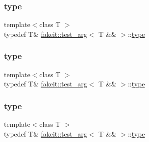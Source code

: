 \subsubsection{\texorpdfstring{type}{type}\hspace{0.1cm}{\footnotesize\ttfamily [1/9]}}
{\footnotesize\ttfamily template$<$class T $>$ \\
typedef T\& \mbox{\hyperlink{structfakeit_1_1test__arg}{fakeit\+::test\+\_\+arg}}$<$ T \&\& $>$\+::\mbox{\hyperlink{structfakeit_1_1test__arg_3_01T_01_6_6_01_4_aaace2782c3dd97bd31e137f8c7c47f5f}{type}}}

\mbox{\label{structfakeit_1_1test__arg_3_01T_01_6_6_01_4_aaace2782c3dd97bd31e137f8c7c47f5f}} 
\subsubsection{\texorpdfstring{type}{type}\hspace{0.1cm}{\footnotesize\ttfamily [2/9]}}
{\footnotesize\ttfamily template$<$class T $>$ \\
typedef T\& \mbox{\hyperlink{structfakeit_1_1test__arg}{fakeit\+::test\+\_\+arg}}$<$ T \&\& $>$\+::\mbox{\hyperlink{structfakeit_1_1test__arg_3_01T_01_6_6_01_4_aaace2782c3dd97bd31e137f8c7c47f5f}{type}}}

\mbox{\label{structfakeit_1_1test__arg_3_01T_01_6_6_01_4_aaace2782c3dd97bd31e137f8c7c47f5f}} 
\subsubsection{\texorpdfstring{type}{type}\hspace{0.1cm}{\footnotesize\ttfamily [3/9]}}
{\footnotesize\ttfamily template$<$class T $>$ \\
typedef T\& \mbox{\hyperlink{structfakeit_1_1test__arg}{fakeit\+::test\+\_\+arg}}$<$ T \&\& $>$\+::\mbox{\hyperlink{structfakeit_1_1test__arg_3_01T_01_6_6_01_4_aaace2782c3dd97bd31e137f8c7c47f5f}{type}}}

\mbox{\label{structfakeit_1_1test__arg_3_01T_01_6_6_01_4_aaace2782c3dd97bd31e137f8c7c47f5f}} 
